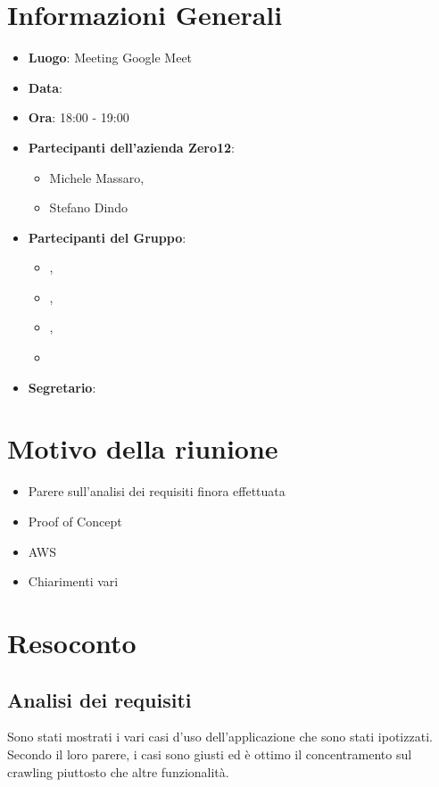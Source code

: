 \section{Informazioni Generali}

\begin{itemize}
\item{\textbf{Luogo}}: Meeting Google Meet
\item{\textbf{Data}}: \D{}
\item{\textbf{Ora}}: 18:00 - 19:00
\item{\textbf{Partecipanti dell'azienda Zero12}}: 
	\begin{itemize}
	\item{Michele Massaro,} 
	\item{Stefano Dindo}
	\end{itemize} 
\item{\textbf{Partecipanti del Gruppo}}: 
	\begin{itemize}
	\item{\EP{},} 
	\item{\GC{},}
	\item{\MB{},}
	\item{\PV{}}
	\end{itemize} 
\item{\textbf{Segretario}}: \PV{}	
\end{itemize}

\section{Motivo della riunione}
\begin{itemize}
\item{Parere sull'analisi dei requisiti finora effettuata}
\item{Proof of Concept}
\item{AWS}
\item{Chiarimenti vari}
\end{itemize}

\section{Resoconto}

\subsection{Analisi dei requisiti}

Sono stati mostrati i vari casi d'uso dell'applicazione che sono stati ipotizzati. Secondo il loro parere, i casi sono giusti ed è ottimo il concentramento sul crawling piuttosto che altre funzionalità.

